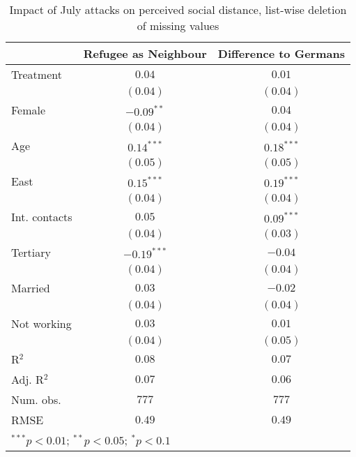 
\begin{table}
\caption{Impact of July attacks on perceived social distance, list-wise deletion of missing values}
\begin{center}
\begin{tabular}{l c c}
\toprule
 & Refugee as Neighbour & Difference to Germans \\
\midrule
Treatment     & $0.04$        & $0.01$       \\
              & $(0.04)$      & $(0.04)$     \\
Female        & $-0.09^{**}$  & $0.04$       \\
              & $(0.04)$      & $(0.04)$     \\
Age           & $0.14^{***}$  & $0.18^{***}$ \\
              & $(0.05)$      & $(0.05)$     \\
East          & $0.15^{***}$  & $0.19^{***}$ \\
              & $(0.04)$      & $(0.04)$     \\
Int. contacts & $0.05$        & $0.09^{***}$ \\
              & $(0.04)$      & $(0.03)$     \\
Tertiary      & $-0.19^{***}$ & $-0.04$      \\
              & $(0.04)$      & $(0.04)$     \\
Married       & $0.03$        & $-0.02$      \\
              & $(0.04)$      & $(0.04)$     \\
Not working   & $0.03$        & $0.01$       \\
              & $(0.04)$      & $(0.05)$     \\
\midrule
R$^2$         & $0.08$        & $0.07$       \\
Adj. R$^2$    & $0.07$        & $0.06$       \\
Num. obs.     & $777$         & $777$        \\
RMSE          & $0.49$        & $0.49$       \\
\bottomrule
\multicolumn{3}{l}{\scriptsize{$^{***}p<0.01$; $^{**}p<0.05$; $^{*}p<0.1$}}
\end{tabular}
\label{tab_dist_na}
\end{center}
\end{table}
